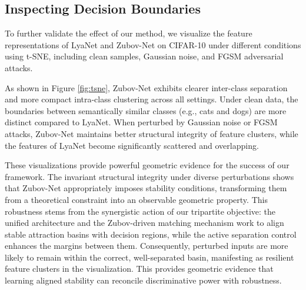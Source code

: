 \documentclass[journal]{IEEEtran}
\begin{document}
\subsection{Inspecting Decision Boundaries}
To further validate the effect of our method, we visualize the feature representations of LyaNet and Zubov-Net on CIFAR-10 under different conditions using t-SNE, including clean samples, Gaussian noise, and FGSM adversarial attacks.

As shown in Figure \ref{fig:tsne}, Zubov-Net exhibits clearer inter-class separation and more compact intra-class clustering across all settings. Under clean data, the boundaries between semantically similar classes (e.g., cats and dogs) are more distinct compared to LyaNet. When perturbed by Gaussian noise or FGSM attacks, Zubov-Net maintains better structural integrity of feature clusters, while the features of LyaNet become significantly scattered and overlapping.

These visualizations provide powerful geometric evidence for the success of our framework.  The invariant structural integrity under diverse perturbations shows that  Zubov-Net appropriately imposes stability conditions, transforming them from a theoretical constraint into an observable geometric property. This robustness stems from the synergistic action of our tripartite objective: the unified architecture and the Zubov-driven matching mechanism work to align stable attraction basins with decision regions, while the active separation control enhances the margins between them. Consequently, perturbed inputs are more likely to remain within the correct, well-separated basin, manifesting as resilient feature clusters in the visualization. This provides geometric evidence that learning aligned stability can reconcile discriminative power with robustness.
\end{document}
